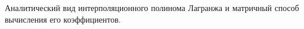 \documentclass[__main__.tex]{subfiles}
\begin{document}
Аналитический вид интерполяционного полинома Лагранжа и матричный способ вычисления его коэффициентов.
\end{document}
